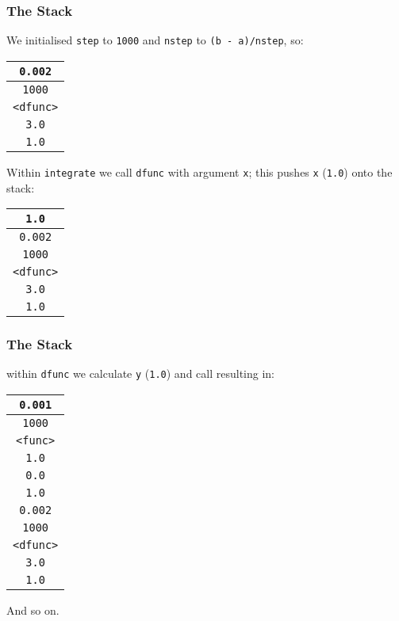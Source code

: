 \documentclass[10pt, t]{beamer}
\begin{document}
\begin{frame}
\frametitle{The Stack}
\label{sec-5_1_7}


We initialised \texttt{step} to \texttt{1000} and \texttt{nstep} to \texttt{(b - a)/nstep}, so:


\begin{center}
\begin{tabular}{|c|}
\hline
 \texttt{0.002}    \\
\hline
 \texttt{1000}     \\
\hline
 \texttt{<dfunc>}  \\
\hline
 \texttt{3.0}      \\
\hline
 \texttt{1.0}      \\
\hline
\hline
\end{tabular}
\end{center}


\pause

Within \texttt{integrate} we call \texttt{dfunc} with argument \texttt{x}; this pushes \texttt{x} (\texttt{1.0}) onto the stack:


\begin{center}
\begin{tabular}{|c|}
\hline
 \texttt{1.0}      \\
\hline
\hline
 \texttt{0.002}    \\
\hline
 \texttt{1000}     \\
\hline
 \texttt{<dfunc>}  \\
\hline
 \texttt{3.0}      \\
\hline
 \texttt{1.0}      \\
\hline
\hline
\end{tabular}
\end{center}
\end{frame}
\begin{frame}
\frametitle{The Stack}
\label{sec-5_1_8}


within \texttt{dfunc} we calculate \texttt{y} (\texttt{1.0}) and call  resulting in:


\begin{center}
\begin{tabular}{|c|}
\hline
 \texttt{0.001}    \\
\hline
 \texttt{1000}     \\
\hline
 \texttt{<func>}   \\
\hline
 \texttt{1.0}      \\
\hline
 \texttt{0.0}      \\
\hline
\hline
 \texttt{1.0}      \\
\hline
\hline
 \texttt{0.002}    \\
\hline
 \texttt{1000}     \\
\hline
 \texttt{<dfunc>}  \\
\hline
 \texttt{3.0}      \\
\hline
 \texttt{1.0}      \\
\hline
\hline
\end{tabular}
\end{center}



And so on.
\end{frame}
\end{document}
